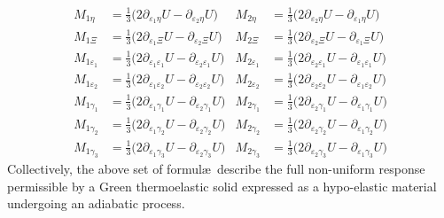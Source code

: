 \begin{subequations}  
    \label{shearEnergies}
    \begin{align}
    M_{1\eta} & = \tfrac{1}{3} \bigl( 2 \partial_{\varepsilon_1 \eta} U -
        \partial_{\varepsilon_2 \eta} U \bigr) &
    M_{2\eta} & = \tfrac{1}{3} \bigl( 2 \partial_{\varepsilon_2 \eta} U -
    \partial_{\varepsilon_1 \eta} U \bigr) \\
    M_{1\Xi} & = \tfrac{1}{3} \bigl( 2 \partial_{\varepsilon_1 \Xi} U -
    \partial_{\varepsilon_2 \Xi} U \bigr) &
    M_{2\Xi} & = \tfrac{1}{3} \bigl( 2 \partial_{\varepsilon_2 \Xi} U -
    \partial_{\varepsilon_1 \Xi} U \bigr) \\
    M_{1\varepsilon_1} & = \tfrac{1}{3} \bigl( 2 \partial_{\varepsilon_1 \varepsilon_1} U -
    \partial_{\varepsilon_2 \varepsilon_1} U \bigr) & 
    M_{2\varepsilon_1} & = \tfrac{1}{3} \bigl( 2 \partial_{\varepsilon_2 \varepsilon_1} U -
    \partial_{\varepsilon_1 \varepsilon_1} U \bigr) \\
    M_{1\varepsilon_2} & = \tfrac{1}{3} \bigl( 2 \partial_{\varepsilon_1 \varepsilon_2} U -
    \partial_{\varepsilon_2 \varepsilon_2} U \bigr) & 
    M_{2\varepsilon_2} & = \tfrac{1}{3} \bigl( 2 \partial_{\varepsilon_2 \varepsilon_2} U -
    \partial_{\varepsilon_1 \varepsilon_2} U \bigr) \\
    M_{1\gamma_1} & = \tfrac{1}{3} \bigl( 2 \partial_{\varepsilon_1 \gamma_1} U -
    \partial_{\varepsilon_2 \gamma_1} U \bigr) &
    M_{2\gamma_1} & = \tfrac{1}{3} \bigl( 2 \partial_{\varepsilon_2 \gamma_1} U -
    \partial_{\varepsilon_1 \gamma_1} U \bigr) \\
    M_{1\gamma_2} & = \tfrac{1}{3} \bigl( 2 \partial_{\varepsilon_1 \gamma_2} U -
    \partial_{\varepsilon_2 \gamma_2} U \bigr) &
    M_{2\gamma_2} & = \tfrac{1}{3} \bigl( 2 \partial_{\varepsilon_2 \gamma_2} U -
    \partial_{\varepsilon_1 \gamma_2} U \bigr) \\
    M_{1\gamma_3} & = \tfrac{1}{3} \bigl( 2 \partial_{\varepsilon_1 \gamma_3} U -
    \partial_{\varepsilon_2 \gamma_3} U \bigr) &
    M_{2\gamma_3} & = \tfrac{1}{3} \bigl( 2 \partial_{\varepsilon_2 \gamma_3} U -
    \partial_{\varepsilon_1 \gamma_3} U \bigr)
    \end{align}
\end{subequations}
Collectively, the above set of formul\ae\ describe the full non-uniform response permissible by a Green thermo\-elastic solid expressed as a hypo-elastic material undergoing an adiabatic process.

